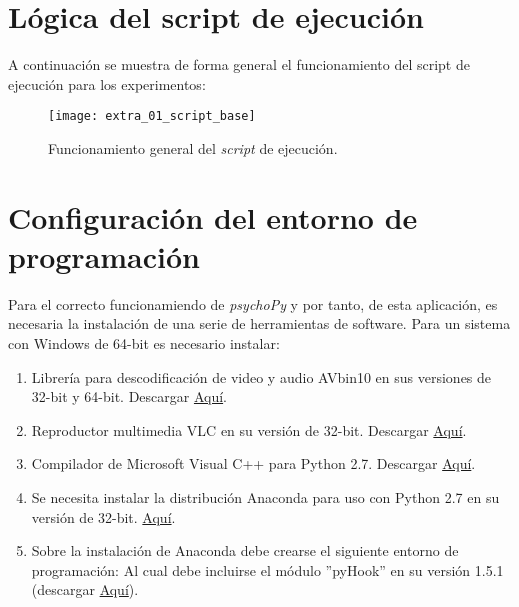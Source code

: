\documentclass[\main/Main.tex]{subfiles}
\begin{document}
	\chapter{Lógica del script de ejecución}
	\label{cha:a01_script}
		A continuación se muestra de forma general el funcionamiento del script de ejecución para los experimentos:
		\begin{figure}[H]
            \centering
            \texttt{[image: extra\_01\_script\_base]}
            \caption{Funcionamiento general del \textit{script} de ejecución.}
            \label{fig:a01_script}
        \end{figure} 

	\chapter{Configuración del entorno de programación}
	\label{cha:a02_install}
		Para el correcto funcionamiendo de \textit{psychoPy} y por tanto, de esta aplicación, es necesaria la instalación de una serie de herramientas de software. Para un sistema con Windows de 64-bit es necesario instalar:
		\begin{enumerate}\setlength\itemsep{-0.5em}		
			\item Librería para descodificación de video y audio AVbin10 en sus versiones de 32-bit y 64-bit. Descargar \href{http://avbin.github.io/AVbin/Download.html}{Aquí}. 
			\item Reproductor multimedia VLC en su versión de 32-bit. Descargar \href{https://www.videolan.org/vlc/download-windows.es.html}{Aquí}. 
			\item Compilador de Microsoft Visual C++ para Python 2.7. Descargar \href{https://www.microsoft.com/en-us/download/details.aspx?id=44266}{Aquí}. 
			\item Se necesita instalar la distribución Anaconda para uso con Python 2.7 en su versión de 32-bit. \href{https://www.anaconda.com/download/#download}{Aquí}. 
			\item Sobre la instalación de Anaconda debe crearse el siguiente entorno de programación: 
			Al cual debe incluirse el módulo ''pyHook'' en su versión 1.5.1 (descargar \href{https://www.lfd.uci.edu/~gohlke/pythonlibs/#pyhook}{Aquí}). 
		\end{enumerate}
\end{document}
